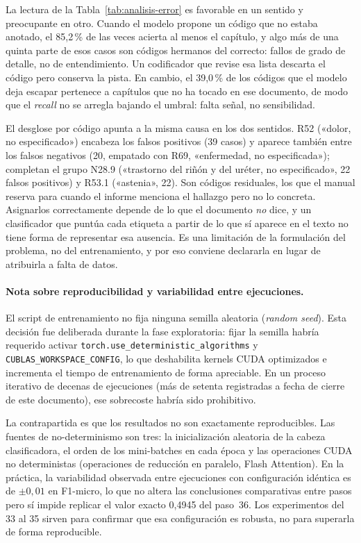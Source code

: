 La lectura de la Tabla~\ref{tab:analisis-error} es favorable en un sentido y preocupante en otro. Cuando el modelo propone un código que no estaba anotado, el 85,2\,\% de las veces acierta al menos el capítulo, y algo más de una quinta parte de esos casos son códigos hermanos del correcto: fallos de grado de detalle, no de entendimiento. Un codificador que revise esa lista descarta el código pero conserva la pista. En cambio, el 39,0\,\% de los códigos que el modelo deja escapar pertenece a capítulos que no ha tocado en ese documento, de modo que el \emph{recall} no se arregla bajando el umbral: falta señal, no sensibilidad.

El desglose por código apunta a la misma causa en los dos sentidos. R52 («dolor, no especificado») encabeza los falsos positivos (39 casos) y aparece también entre los falsos negativos (20, empatado con R69, «enfermedad, no especificada»); completan el grupo N28.9 («trastorno del riñón y del uréter, no especificado», 22 falsos positivos) y R53.1 («astenia», 22). Son códigos residuales, los que el manual reserva para cuando el informe menciona el hallazgo pero no lo concreta. Asignarlos correctamente depende de lo que el documento \emph{no} dice, y un clasificador que puntúa cada etiqueta a partir de lo que sí aparece en el texto no tiene forma de representar esa ausencia. Es una limitación de la formulación del problema, no del entrenamiento, y por eso conviene declararla en lugar de atribuirla a falta de datos.

\paragraph{Nota sobre reproducibilidad y variabilidad entre ejecuciones.}
\begin{sloppypar}
El script de entrenamiento no fija ninguna semilla aleatoria (\emph{random seed}). Esta decisión fue deliberada durante la fase exploratoria: fijar la semilla habría requerido activar \texttt{torch.use\_deterministic\_algorithms} y \texttt{CUBLAS\_WORKSPACE\_CONFIG}, lo que deshabilita kernels CUDA optimizados e incrementa el tiempo de entrenamiento de forma apreciable. En un proceso iterativo de decenas de ejecuciones (más de setenta registradas a fecha de cierre de este documento), ese sobrecoste habría sido prohibitivo.
\end{sloppypar}

La contrapartida es que los resultados no son exactamente reproducibles. Las fuentes de no-determinismo son tres: la inicialización aleatoria de la cabeza clasificadora, el orden de los mini-batches en cada época y las operaciones CUDA no deterministas (operaciones de reducción en paralelo, Flash Attention). En la práctica, la variabilidad observada entre ejecuciones con configuración idéntica es de $\pm 0{,}01$ en F1-micro, lo que no altera las conclusiones comparativas entre pasos pero sí impide replicar el valor exacto 0,4945 del paso~36. Los experimentos del 33 al 35 sirven para confirmar que esa configuración es robusta, no para superarla de forma reproducible.

